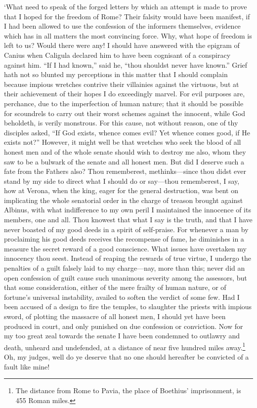 \documentclass[12pt]{book}
\begin{document}
`What need to speak of the forged letters by which an attempt is     
made to prove that I hoped for the freedom of Rome? Their falsity       
would have been manifest, if I had been allowed to use the confession   
of the informers themselves, evidence which has in all matters the      
most convincing force. Why, what hope of freedom is left to us? Would   
there were any! I should have answered with the epigram of Canius when  
Caligula declared him to have been cognisant of a conspiracy against    
him. ``If I had known,'' said he, ``thou shouldst never have known.''       
Grief hath not so blunted my perceptions in this matter that I should   
complain because impious wretches contrive their villainies against     
the virtuous, but at their achievement of their hopes I do exceedingly  
marvel. For evil purposes are, perchance, due to the imperfection       
of human nature; that it should be possible for scoundrels to carry     
out their worst schemes against the innocent, while God beholdeth,      
is verily monstrous. For this cause, not without reason, one of thy     
disciples asked, ``If God exists, whence comes evil? Yet whence comes    
good, if He exists not?'' However, it might well be that wretches who    
seek the blood of all honest men and of the whole senate should wish    
to destroy me also, whom they saw to be a bulwark of the senate and     
all honest men. But did I deserve such a fate from the Fathers also?    
Thou rememberest, methinks---since thou didst ever stand by my side      
to direct what I should do or say---thou rememberest, I say, how at      
Verona, when the king, eager for the general destruction, was bent on   
implicating the whole senatorial order in the charge of treason brought 
against Albinus, with what indifference to my own peril I maintained    
the innocence of its members, one and all. Thou knowest that what I     
say is the truth, and that I have never boasted of my good deeds in     
a spirit of self-praise. For whenever a man by proclaiming his good     
deeds receives the recompense of fame, he diminishes in a measure the   
secret reward of a good conscience. What issues have overtaken my       
innocency thou seest. Instead of reaping the rewards of true virtue,    
I undergo the penalties of a guilt falsely laid to my charge---nay,      
more than this; never did an open confession of guilt cause such        
unanimous severity among the assessors, but that some consideration,    
either of the mere frailty of human nature, or of fortune's universal   
instability, availed to soften the verdict of some few. Had I been      
accused of a design to fire the temples, to slaughter the priests with  
impious sword, of plotting the massacre of all honest men, I should yet 
have been produced in court, and only punished on due confession or     
conviction. Now for my too great zeal towards the senate I have been    
condemned to outlawry and death, unheard and undefended, at a distance  
of near five hundred miles away.\footnote{The distance from Rome to     
Pavia, the place of Boethius' imprisonment, is 455 Roman miles.} Oh, my 
judges, well do ye deserve that no one should hereafter be convicted of 
a fault like mine!                                                      
\end{document}

